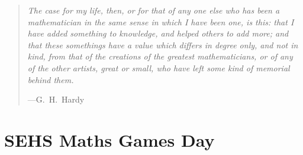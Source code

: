 \documentclass[a4paper]{amsbook}
\newcommand{\epigraph}[2]{%
\newpage \vspace*{8cm}
\thispagestyle{empty}
  \begin{quote}
	  {	
    \emph{#1}
    \begin{flushright}---{#2}
    \end{flushright}}
  \end{quote}}
\begin{document}


















\epigraph{The case for my life, then, or for that of any one else
who has been a mathematician in the same sense in which I have been one,
is this: that I have added something to knowledge, and helped others to add more;
and that these somethings have a value which differs in degree only, and not
in kind, from that of the creations of the greatest mathematicians, or
of any of the other artists, great or small, who have left some kind
of memorial behind them.}{G.~H.~Hardy}
\part{SEHS Maths Games Day}



% 
\end{document}
